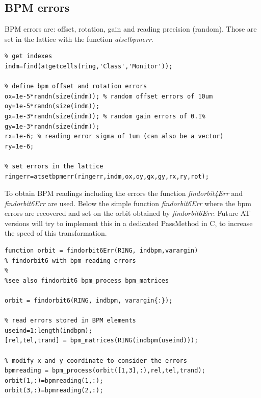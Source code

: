 \subsection{BPM errors}
BPM errors are: offset, rotation, gain and reading precision (random). Those are set in the lattice with the function \emph{atsetbpmerr}. 
\begin{lstlisting}
% get indexes
indm=find(atgetcells(ring,'Class','Monitor'));

% define bpm offset and rotation errors
ox=1e-5*randn(size(indm)); % random offset errors of 10um
oy=1e-5*randn(size(indm)); 
gx=1e-3*randn(size(indm)); % random gain errors of 0.1%
gy=1e-3*randn(size(indm));  
rx=1e-6; % reading error sigma of 1um (can also be a vector)
ry=1e-6;

% set errors in the lattice
ringerr=atsetbpmerr(ringerr,indm,ox,oy,gx,gy,rx,ry,rot);

\end{lstlisting}
To obtain BPM readings including the errors the function \emph{findorbit4Err} and \emph{findorbit6Err} are used. Below the simple function \emph{findorbit6Err} where the bpm errors are recovered and set on the orbit obtained by \emph{findorbit6Err}.
Future AT versions will try to implement this in a dedicated PassMethod in C, to increase the speed of this transformation. 

\begin{lstlisting}
function orbit = findorbit6Err(RING, indbpm,varargin)
% findorbit6 with bpm reading errors
%
%see also findorbit6 bpm_process bpm_matrices

orbit = findorbit6(RING, indbpm, varargin{:});

% read errors stored in BPM elements
useind=1:length(indbpm);
[rel,tel,trand] = bpm_matrices(RING(indbpm(useind)));

% modify x and y coordinate to consider the errors
bpmreading = bpm_process(orbit([1,3],:),rel,tel,trand);
orbit(1,:)=bpmreading(1,:);
orbit(3,:)=bpmreading(2,:);

\end{lstlisting}

